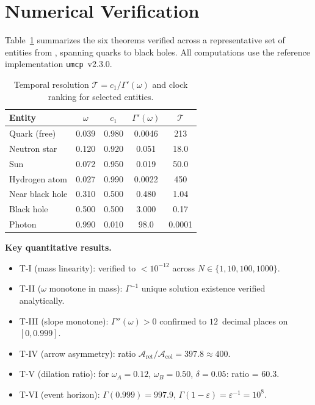 \documentclass[
  aps,
  prd,
  twocolumn,
  superscriptaddress,
  nofootinbib,
  floatfix
]{revtex4-2}
\newcommand{\Gam}{\Gamma}
\newcommand{\eps}{\varepsilon}
\newcommand{\Tres}{\mathcal{T}}
\newcommand{\Aret}{\mathcal{A}_{\mathrm{ret}}}         %
\newcommand{\Acol}{\mathcal{A}_{\mathrm{col}}}         %
\begin{document}
\section{Numerical Verification}\label{sec:numerical}

Table~\ref{tab:entities} summarizes the six theorems verified
across a representative set of entities from
\cite{paulus2026spacetimememory}, spanning quarks to black
holes.  All computations use the reference implementation
\texttt{umcp}~v2.3.0.

\begin{table}[h]
\centering
\caption{Temporal resolution $\Tres = c_1/\Gam'(\omega)$
and clock ranking for selected entities.}
\label{tab:entities}
\begin{tabular}{lcccc}
\toprule
Entity & $\omega$ & $c_1$ & $\Gam'(\omega)$ & $\Tres$ \\
\midrule
Quark (free)    & 0.039 & 0.980 & 0.0046 & 213  \\
Neutron star    & 0.120 & 0.920 & 0.051  & 18.0 \\
Sun             & 0.072 & 0.950 & 0.019  & 50.0 \\
Hydrogen atom   & 0.027 & 0.990 & 0.0022 & 450  \\
Near black hole & 0.310 & 0.500 & 0.480  & 1.04 \\
Black hole      & 0.500 & 0.500 & 3.000  & 0.17 \\
Photon          & 0.990 & 0.010 & 98.0   & 0.0001\\
\bottomrule
\end{tabular}
\end{table}

\textbf{Key quantitative results.}
\begin{itemize}
  \item T-I (mass linearity): verified to $< 10^{-12}$
    across $N \in \{1, 10, 100, 1000\}$.
  \item T-II ($\omega$ monotone in mass): $\Gam^{-1}$
    unique solution existence verified analytically.
  \item T-III (slope monotone): $\Gam''(\omega) > 0$
    confirmed to $12$~decimal places on $[0,0.999]$.
  \item T-IV (arrow asymmetry): ratio $\Aret/\Acol = 397.8
    \approx 400$.
  \item T-V (dilation ratio): for $\omega_A = 0.12$,
    $\omega_B = 0.50$, $\delta = 0.05$: ratio = $60.3$.
  \item T-VI (event horizon): $\Gam(0.999) = 997.9$,
    $\Gam(1 - \eps) = \eps^{-1} = 10^8$.
\end{itemize}
\end{document}
